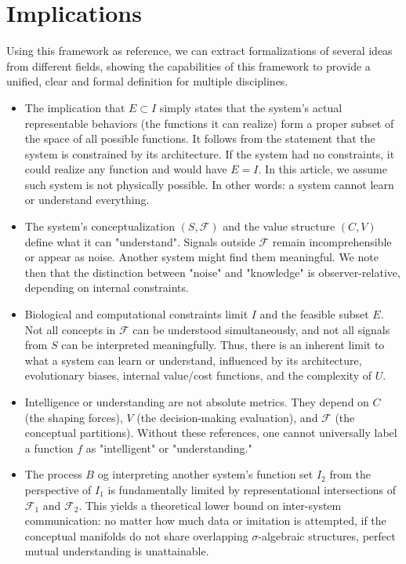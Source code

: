 \documentclass[]{article}
\begin{document}
\section{Implications}
Using this framework as reference, we can extract formalizations of several ideas from different fields, showing the capabilities of this framework to provide a unified, clear and formal definition for multiple disciplines.
\begin{itemize}
	\item The implication that $E \subset I$ simply states that the system's actual representable behaviors (the functions it can realize) form a proper subset of the space of all possible functions. It follows from the statement that the system is constrained by its architecture. If the system had no constraints, it could realize any function and would have $E = I$. In this article, we assume such system is not physically possible. In other words: a system cannot learn or understand everything.
	\item The system's conceptualization $(S, \mathcal{F})$ and the value structure $(C, V)$ define what it can "understand". Signals outside $\mathcal{F}$ remain incomprehensible or appear as noise. Another system might find them meaningful. We note then that the distinction between "noise" and "knowledge" is observer-relative, depending on internal constraints.
	\item Biological and computational constraints limit $I$ and the feasible subset $E$. Not all concepts in $\mathcal{F}$ can be understood simultaneously, and not all signals from $S$ can be interpreted meaningfully. Thus, there is an inherent limit to what a system can learn or understand, influenced by its architecture, evolutionary biases, internal value/cost functions, and the complexity of $U$.
	\item Intelligence or understanding are not absolute metrics. They depend on $C$ (the shaping forces), $V$ (the decision-making evaluation), and $\mathcal{F}$ (the conceptual partitions). Without these references, one cannot universally label a function $f$ as "intelligent" or "understanding."
	\item The process $B$ og interpreting another system's function set $I_2$ from the perspective of $I_1$ is fundamentally limited by representational intersections of $\mathcal{F}_1$ and $\mathcal{F}_2$. This yields a theoretical lower bound on inter-system communication: no matter how much data or imitation is attempted, if the conceptual manifolds do not share overlapping $\sigma$-algebraic structures, perfect mutual understanding is unattainable.

\end{itemize}
\end{document}
